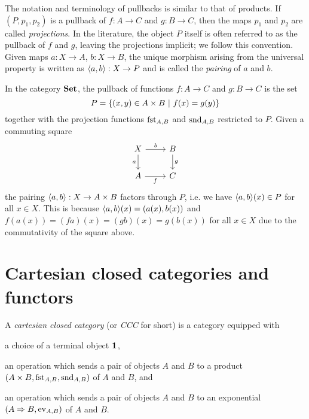 The notation and terminology of pullbacks is similar to that of products. If $(P, p_1, p_2)$ is a pullback of $f : A \to C$ and $g : B \to C$, then the maps $p_1$ and $p_2$ are called \emph{projections}. In the literature, the object $P$ itself is often referred to as the pullback of $f$ and $g$, leaving the projections implicit; we follow this convention. Given maps $a : X \to A$, $b : X \to B$, the unique morphism arising from the universal property is written as $\mpair{a}{b} : X \to P$ and is called the \emph{pairing} of $a$ and $b$.

\begin{ex} \label{ex:set-pullbacks}
In the category $\Set$, the pullback of functions $f : A \to C$ and $g : B \to C$ is the set
\[ P = \setof{(x, y) \in \cartprod{A}{B}}{f(x) = g(y)} \]
together with the projection functions $\mfst[A,B]$ and $\msnd[A,B]$ restricted to $P$. Given a commuting square
\[\begin{tikzcd}
	X & B \\
	A & C
	\arrow["f"', from=2-1, to=2-2]
	\arrow["g", from=1-2, to=2-2]
	\arrow["a"', from=1-1, to=2-1]
	\arrow["b", from=1-1, to=1-2]
\end{tikzcd}\]
the pairing $\mpair{a}{b} : X \to \cartprod{A}{B}$ factors through $P$, i.e. we have $\mpair{a}{b}(x) \in P$ for all $x \in X$. This is because $\mpair{a}{b}(x) = (a(x), b(x))$ and $f(a(x)) = (fa)(x) = (gb)(x) = g(b(x))$ for all $x \in X$ due to the commutativity of the square above.
\end{ex}




\section{Cartesian closed categories and functors}

\begin{defn} \label{def:ccc}
A \emph{cartesian closed category} (or \textit{CCC} for short) is a category equipped with
\begin{items}
    \item a choice of a terminal object $\1$,
    \item an operation which sends a pair of objects $A$ and $B$ to a product $(\cprod{A}{B}, \mfst[A,B], \msnd[A,B])$ of $A$ and $B$, and
    \item an operation which sends a pair of objects $A$ and $B$ to an exponential $(\cexp{A}{B}, \mev[A,B])$ of $A$ and $B$.
\end{items}
\end{defn}


